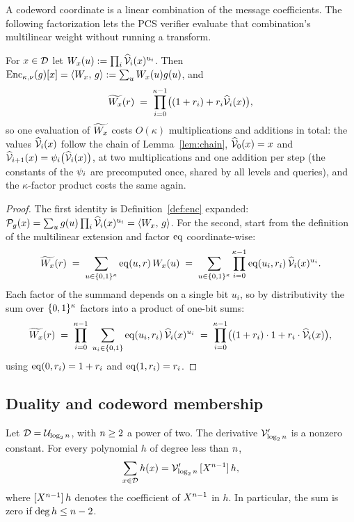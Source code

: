 A codeword coordinate is a linear combination of the message coefficients. The following factorization lets the PCS verifier evaluate that combination's multilinear weight without running a transform.

\begin{lemma}\label{lem:colweight}
For $x \in \mathcal{D}$ let $W_x(u) := \prod_i \widehat{\mathcal{V}}_{i}(x)^{u_i}$. Then $\mathrm{Enc}_{\kappa,\nu}(g)[x] = \langle W_x,\, g \rangle := \sum_u W_x(u) g(u)$, and
\[
\widetilde{W_x}(r) \;=\; \prod_{i=0}^{\kappa-1} \bigl( (1+r_i) + r_i \widehat{\mathcal{V}}_{i}(x) \bigr),
\]
so one evaluation of $\widetilde{W_x}$ costs $O(\kappa)$ multiplications and additions in total: the values $\widehat{\mathcal{V}}_{i}(x)$ follow the chain of Lemma~\ref{lem:chain}, $\widehat{\mathcal{V}}_{0}(x) = x$ and $\widehat{\mathcal{V}}_{i+1}(x) = \psi_i\bigl(\widehat{\mathcal{V}}_{i}(x)\bigr)$, at two multiplications and one addition per step (the constants of the $\psi_i$ are precomputed once, shared by all levels and queries), and the $\kappa$-factor product costs the same again.
\end{lemma}

\begin{proof}
The first identity is Definition~\ref{def:enc} expanded: $\mathcal{P}_g(x) = \sum_u g(u) \prod_i \widehat{\mathcal{V}}_{i}(x)^{u_i} = \langle W_x,\, g \rangle$. For the second, start from the definition of the multilinear extension and factor $\operatorname{eq}$ coordinate-wise:
\[
\widetilde{W_x}(r) \;=\; \sum_{u \in \{0,1\}^{\kappa}} \operatorname{eq}(u, r)\, W_x(u) \;=\; \sum_{u \in \{0,1\}^{\kappa}} \prod_{i=0}^{\kappa-1} \operatorname{eq}(u_i, r_i)\, \widehat{\mathcal{V}}_{i}(x)^{u_i} .
\]
Each factor of the summand depends on a single bit $u_i$, so by distributivity the sum over $\{0,1\}^{\kappa}$ factors into a product of one-bit sums:
\[
\widetilde{W_x}(r) \;=\; \prod_{i=0}^{\kappa-1} \; \sum_{u_i \in \{0,1\}} \operatorname{eq}(u_i, r_i)\, \widehat{\mathcal{V}}_{i}(x)^{u_i} \;=\; \prod_{i=0}^{\kappa-1} \bigl( (1+r_i) \cdot 1 + r_i \cdot \widehat{\mathcal{V}}_{i}(x) \bigr),
\]
using $\operatorname{eq}(0, r_i) = 1 + r_i$ and $\operatorname{eq}(1, r_i) = r_i$.
\end{proof}

\subsection{Duality and codeword membership}\label{sec:ntt-duality}

\begin{lemma}\label{lem:domain-sum}
Let $\mathcal{D}=\mathcal{U}_{\log_2n}$, with $n\ge2$ a power of two. The derivative $\mathcal{V}_{\log_2n}'$ is a nonzero constant. For every polynomial $h$ of degree less than $n$,
\begin{equation}\label{eq:da-sum}
  \sum_{x\in\mathcal{D}} h(x)
  = \mathcal{V}_{\log_2n}'\,[X^{n-1}]\,h,
\end{equation}
where $[X^{n-1}]\,h$ denotes the coefficient of $X^{n-1}$ in $h$. In particular, the sum is zero if $\deg h\le n-2$.
\end{lemma}

